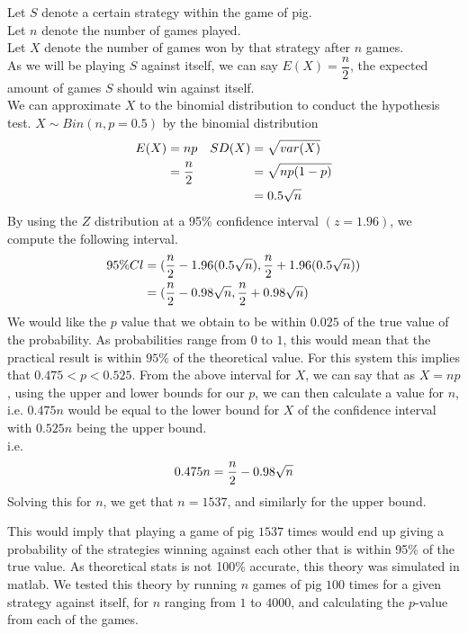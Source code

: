 \documentclass[a4paper,titlepage]{article}
\begin{document}
Let $S$ denote a certain strategy within the game of pig.\\ Let $n$ denote the number of games played.\\Let $X$ denote the number of games won by that strategy after $n$ games.\\ As we will be playing $S$ against itself, we can say $E(X)=\dfrac{n}{2}$, the expected amount of games $S$ should win against itself. \\We can approximate $X$ to the binomial distribution to conduct the hypothesis test. $X \sim Bin(n , p=0.5)$
by the binomial distribution
\begin{align}
E(X) &= np & SD(X) &= \sqrt{var(X)}\notag\\
&= \dfrac{n}{2} & &= \sqrt{np(1-p)}\notag\\
& & &= 0.5\sqrt{n} \notag
\end{align}
By using the $Z$ distribution at a 95\% confidence interval $(z=1.96)$, we compute the following interval.
\begin{align}
95\%Cl &= (\dfrac{n}{2} -1.96(0.5\sqrt{n}), \dfrac{n}{2} +1.96(0.5\sqrt{n}))\notag\\
&= (\dfrac{n}{2}-0.98\sqrt{n}, \dfrac{n}{2}+0.98\sqrt{n})
\notag
\end{align}
We would like the $p$ value that we obtain to be within $0.025$ of the true value of the probability. As probabilities range from $0$ to $1$, this would mean that the practical result is within $95\%$ of the theoretical value. For this system this implies that $0.475<p<0.525$. From the above interval for $X$, we can say that as $X=np$, using the upper and lower bounds for our $p$, we can then calculate a value for $n$, i.e. $0.475n$ would be equal to the lower bound for $X$ of the confidence interval with $0.525n$ being the upper bound.\\i.e.
\begin{equation}
0.475n=\dfrac{n}{2}-0.98\sqrt{n}
\notag
\end{equation}
Solving this for $n$, we get that $n=1537$, and similarly for the upper bound.

This would imply that playing a game of pig $1537$ times would end up giving a probability of the strategies winning against each other that is within 95\% of the true value. As theoretical stats is not 100\% accurate, this theory was simulated in matlab. We tested this theory by running $n$ games of pig $100$ times for a given strategy against itself, for $n$ ranging from $1$ to $4000$, and calculating the $p$-value from each of the games.
\end{document}
